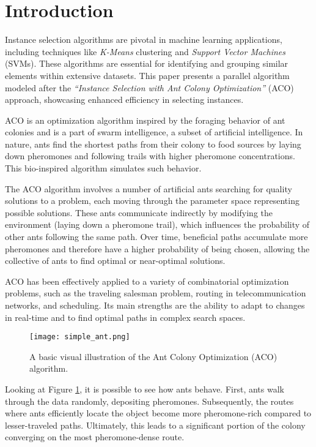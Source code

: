 \section{Introduction}

Instance selection algorithms are pivotal in machine learning applications, including techniques like \emph{K-Means} clustering and \emph{Support Vector Machines} (SVMs). These algorithms are essential for identifying and grouping similar elements within extensive datasets. This paper presents a parallel algorithm modeled after the \emph{``Instance Selection with Ant Colony Optimization''} (ACO) approach, showcasing enhanced efficiency in selecting instances.

ACO is an optimization algorithm inspired by the foraging behavior of ant colonies and is a part of swarm intelligence, a subset of artificial intelligence. In nature, ants find the shortest paths from their colony to food sources by laying down pheromones and following trails with higher pheromone concentrations. This bio-inspired algorithm simulates such behavior.

The ACO algorithm involves a number of artificial ants searching for quality solutions to a problem, each moving through the parameter space representing possible solutions. These ants communicate indirectly by modifying the environment (laying down a pheromone trail), which influences the probability of other ants following the same path. Over time, beneficial paths accumulate more pheromones and therefore have a higher probability of being chosen, allowing the collective of ants to find optimal or near-optimal solutions.

ACO has been effectively applied to a variety of combinatorial optimization problems, such as the traveling salesman problem, routing in telecommunication networks, and scheduling. Its main strengths are the ability to adapt to changes in real-time and to find optimal paths in complex search spaces.

\begin{figure}
    \centering
    \texttt{[image: simple\_ant.png]}
    \caption{A basic visual illustration of the Ant Colony Optimization (ACO) algorithm.}
    \label{fig:simpleant}
\end{figure}

Looking at Figure \ref{fig:simpleant}, it is possible to see how ants behave. First, ants walk through
the data randomly, depositing pheromones. Subsequently, the routes where ants efficiently locate the object become more pheromone-rich compared to lesser-traveled paths. Ultimately, this leads to a significant portion of the colony converging on the most pheromone-dense route.

